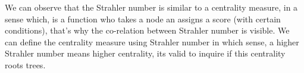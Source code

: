 
We can observe that the Strahler number is similar to a centrality measure, in a sense which, is a function who takes a node an assigns a score (with certain conditions), that's why the co-relation between Strahler number is visible. We can define the centrality measure using Strahler number in which sense, a higher Strahler number means higher centrality, its valid to inquire if this centrality roots trees. 